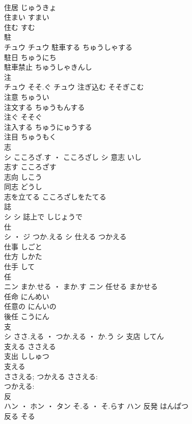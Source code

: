 \documentclass[8pt]{extreport}
\begin{document}
\begin{CJK}{UTF8}{min}
\\	住居	じゅうきょ	
\\	住まい	すまい	
\\	住む	すむ	
\\	駐	
\\	チュウ		チュウ	駐車する	ちゅうしゃする	
\\	駐日	ちゅうにち	
\\	駐車禁止	ちゅうしゃきんし	
\\	注	
\\	チュウ	そそ.ぐ	チュウ	注ぎ込む	そそぎこむ	
\\	注意	ちゅうい	
\\	注文する	ちゅうもんする	
\\	注ぐ	そそぐ	
\\	注入する	ちゅうにゅうする	
\\	注目	ちゅうもく	
\\	志	
\\	シ	こころざ.す ・ こころざし	シ	意志	いし	
\\	志す	こころざす	
\\	志向	しこう	
\\	同志	どうし	
\\	志を立てる	こころざしをたてる	
\\	誌	
\\	シ		シ													誌上で	しじょうで	
\\	仕	
\\	シ ・ ジ	つか.える	シ	仕える	つかえる	
\\	仕事	しごと	
\\	仕方	しかた	
\\	仕手	して	
\\	任	
\\	ニン	まか.せる ・ まか.す	ニン	任せる	まかせる	
\\	任命	にんめい	
\\	任意の	にんいの	
\\	後任	こうにん	
\\	支	
\\	シ	ささ.える ・ つか.える ・ か.う	シ	支店	してん	
\\	支える	ささえる	
\\	支出	ししゅつ	
\\	支える 
\\	ささえる; つかえる	ささえる: 
\\	つかえる: 
\\	反	
\\	ハン ・ ホン ・ タン	そ.る ・ そ.らす	ハン	反発	はんぱつ	
\\	反る	そる	

\end{CJK}
\end{document}
